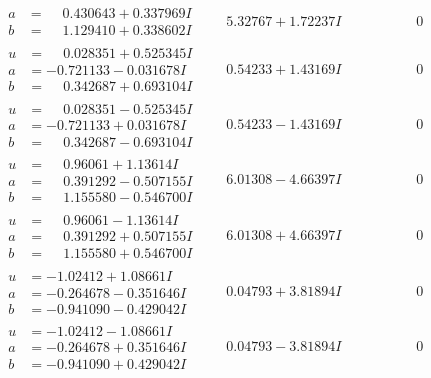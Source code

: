 \documentclass[1p]{elsarticle_modified}
\theoremstyle{definition}
\begin{document}
$$\begin{array}{c|c|c}
\begin{aligned}
a &= \phantom{-}0.430643 + 0.337969 I \\
b &= \phantom{-}1.129410 + 0.338602 I\end{aligned}
 & \phantom{-}5.32767 + 1.72237 I & \phantom{-0.000000 } 0 \\ \hline\begin{aligned}
u &= \phantom{-}0.028351 + 0.525345 I \\
a &= -0.721133 - 0.031678 I \\
b &= \phantom{-}0.342687 + 0.693104 I\end{aligned}
 & \phantom{-}0.54233 + 1.43169 I & \phantom{-0.000000 } 0 \\ \hline\begin{aligned}
u &= \phantom{-}0.028351 - 0.525345 I \\
a &= -0.721133 + 0.031678 I \\
b &= \phantom{-}0.342687 - 0.693104 I\end{aligned}
 & \phantom{-}0.54233 - 1.43169 I & \phantom{-0.000000 } 0 \\ \hline\begin{aligned}
u &= \phantom{-}0.96061 + 1.13614 I \\
a &= \phantom{-}0.391292 - 0.507155 I \\
b &= \phantom{-}1.155580 - 0.546700 I\end{aligned}
 & \phantom{-}6.01308 - 4.66397 I & \phantom{-0.000000 } 0 \\ \hline\begin{aligned}
u &= \phantom{-}0.96061 - 1.13614 I \\
a &= \phantom{-}0.391292 + 0.507155 I \\
b &= \phantom{-}1.155580 + 0.546700 I\end{aligned}
 & \phantom{-}6.01308 + 4.66397 I & \phantom{-0.000000 } 0 \\ \hline\begin{aligned}
u &= -1.02412 + 1.08661 I \\
a &= -0.264678 - 0.351646 I \\
b &= -0.941090 - 0.429042 I\end{aligned}
 & \phantom{-}0.04793 + 3.81894 I & \phantom{-0.000000 } 0 \\ \hline\begin{aligned}
u &= -1.02412 - 1.08661 I \\
a &= -0.264678 + 0.351646 I \\
b &= -0.941090 + 0.429042 I\end{aligned}
 & \phantom{-}0.04793 - 3.81894 I & \phantom{-0.000000 } 0\\

\end{array}$$
\end{document}
